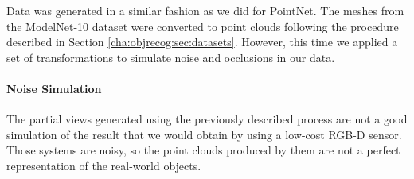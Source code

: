 Data was generated in a similar fashion as we did for PointNet. The meshes from the ModelNet-10 dataset were converted to point clouds following the procedure described in Section \ref{cha:objrecog:sec:datasets}. However, this time we applied a set of transformations to simulate noise and occlusions in our data.

\paragraph{Noise Simulation}

The partial views generated using the previously described process are not a good simulation of the result that we would obtain by using a low-cost \acs{RGB-D} sensor. Those systems are noisy, so the point clouds produced by them are not a perfect representation of the real-world objects.

